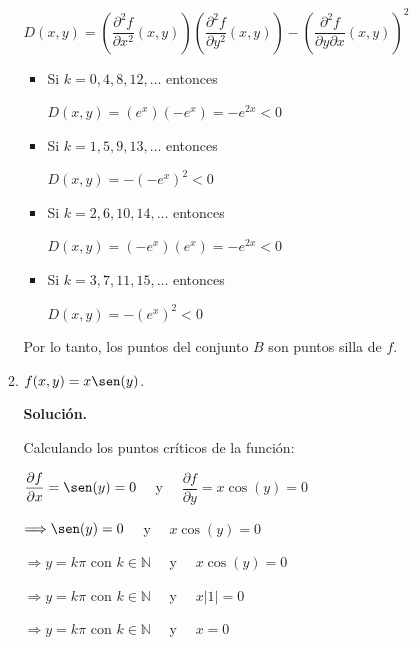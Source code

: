 \documentclass[fleqn, 12pt]{article}
\newcommand{\derivadaparcial}[2]{\dfrac{\partial {#1}}{\partial {#2}}}
\newcommand{\derivadaparcialn}[3]{\dfrac{\partial^{#3} {#1}}{\partial {#2}^{#3}}}
\newcommand{\derivadaparcialnd}[3]{\dfrac{\partial^{2} {#1}}{\partial {#3} \partial {#2}}}
\begin{document}
\begin{enumerate}
\begin{enumerate}
            $  D(x,y) = \left( \derivadaparcialn{f}{x}{2} (x,y) \right) \left( \derivadaparcialn{f}{y}{2} (x,y) \right) - \left( \derivadaparcialnd{f}{x}{y} (x,y) \right)^2 $

            \begin{itemize}
                \item  Si $ k = 0, 4, 8, 12, \ldots $ entonces
            
                $ D(x,y) = \left( e^x \right) \left( -e^x \right) = -e^{2x} < 0 $

                \item  Si $ k = 1, 5, 9, 13, \ldots $ entonces

                $  D(x,y) = - \left( -e^x \right)^2 < 0 $

                \item  Si $ k = 2, 6, 10, 14, \ldots $ entonces

                $  D(x,y) = \left( -e^{x} \right) \left( e^{x} \right) = -e^{2x} < 0 $

                \item  Si $ k = 3, 7, 11, 15, \ldots $ entonces

                $  D(x,y) = - \left( e^x \right)^2 < 0 $
            \end{itemize}

           Por lo tanto, los puntos del conjunto $ B $ son puntos silla de $ f $.
            
            \item $ f(x,y) = x \sen (y) $.
            
            \textbf{Solución.}

            Calculando los puntos críticos de la función:

            $ \derivadaparcial{f}{x} = \sen (y) = 0 \quad $ y $ \quad \derivadaparcial{f}{y} = x \cos (y) = 0 $

            $ \Longrightarrow \sen (y) = 0 \quad $ y $ \quad x \cos (y) = 0 $

            $ \Longrightarrow y = k \pi \text{ con } k \in \mathbb{N} \quad $ y $ \quad x \cos (y) = 0 $

            $ \Longrightarrow y = k \pi \text{ con } k \in \mathbb{N} \quad $ y $ \quad x \lvert 1 \rvert = 0 $

            $ \Longrightarrow y = k \pi \text{ con } k \in \mathbb{N} \quad $ y $ \quad x = 0 $


\end{enumerate}
\end{enumerate}
\end{document}
